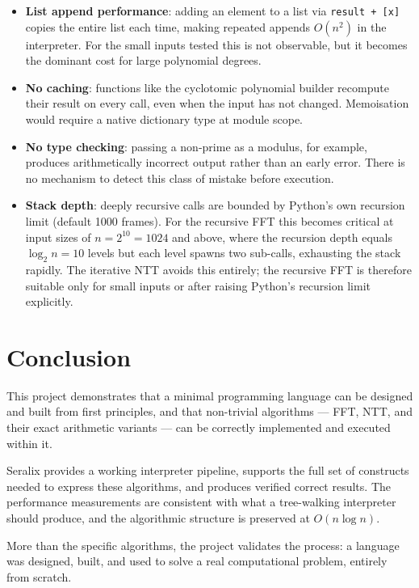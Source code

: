 \documentclass[conference]{IEEEtran}
\begin{document}
\begin{itemize}
    \item \textbf{List append performance}: adding an element to a list via \texttt{result + [x]} copies the entire list each time, making repeated appends $O(n^2)$ in the interpreter. For the small inputs tested this is not observable, but it becomes the dominant cost for large polynomial degrees.
    \item \textbf{No caching}: functions like the cyclotomic polynomial builder recompute their result on every call, even when the input has not changed. Memoisation would require a native dictionary type at module scope.
    \item \textbf{No type checking}: passing a non-prime as a modulus, for example, produces arithmetically incorrect output rather than an early error. There is no mechanism to detect this class of mistake before execution.
    \item \textbf{Stack depth}: deeply recursive calls are bounded by Python's own recursion limit (default 1000 frames). For the recursive FFT this becomes critical at input sizes of $n = 2^{10} = 1024$ and above, where the recursion depth equals $\log_2 n = 10$ levels but each level spawns two sub-calls, exhausting the stack rapidly. The iterative NTT avoids this entirely; the recursive FFT is therefore suitable only for small inputs or after raising Python's recursion limit explicitly.
\end{itemize}

\section{Conclusion}

This project demonstrates that a minimal programming language can be designed and built from first principles, and that non-trivial algorithms — FFT, NTT, and their exact arithmetic variants — can be correctly implemented and executed within it.

Seralix provides a working interpreter pipeline, supports the full set of constructs needed to express these algorithms, and produces verified correct results. The performance measurements are consistent with what a tree-walking interpreter should produce, and the algorithmic structure is preserved at $O(n \log n)$.

More than the specific algorithms, the project validates the process: a language was designed, built, and used to solve a real computational problem, entirely from scratch.
\end{document}
